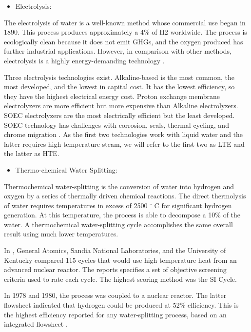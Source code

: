 \documentclass[11pt,letterpaper]{article}
\begin{document}
\begin{itemize}
	\item Electrolysis: 
\end{itemize}

The electrolysis of water is a well-known method whose commercial use began in 1890.
This process produces approximately a 4\% of \gls{H2} worldwide.
The process is ecologically clean because it does not emit \glspl{GHG}, and the oxygen
produced has further industrial applications.
However, in comparison with other methods, electrolysis is a highly energy-demanding technology 
\cite{kalamaras_hydrogen_2013}.

Three electrolysis technologies exist.
Alkaline-based is the most common, the most developed, and the lowest in capital cost.
It has the lowest efficiency, so they have the highest electrical energy cost.
Proton exchange membrane electrolyzers are more efficient but more expensive than Alkaline electrolyzers.
\gls{SOEC} electrolyzers are the most electrically efficient but the least developed.
\gls{SOEC} technology has challenges with corrosion, seals, thermal cycling, and chrome migration \cite{kalamaras_hydrogen_2013}.
As the first two technologies work with liquid water and the latter requires high temperature steam, we will refer to the first two as \gls{LTE} and the latter as \gls{HTE}.

\begin{itemize}
	\item Thermo-chemical Water Splitting:
\end{itemize}

Thermochemical water-splitting is the conversion of water into hydrogen and oxygen by a series of thermally driven chemical reactions.
The direct thermolysis of water requires temperatures in excess of 2500 $^{\circ}$ C for significant hydrogen generation.
At this temperature, the process is able to decompose a 10\% of the water.
A thermochemical water-splitting cycle accomplishes the same overall result using much lower temperatures.

In \cite{brown_high_2003}, General Atomics, Sandia National Laboratories, and the University of Kentucky compared 115 cycles that would use high temperature heat from an advanced nuclear reactor.
The reports specifies a set of objective screening criteria used to rate each cycle.
The highest scoring method was the \gls{SI} Cycle.

In 1978 and 1980, the process was coupled to a nuclear reactor.
The latter flowsheet indicated that hydrogen could be produced at 52\% efficiency.
This is the highest efficiency reported for any water-splitting process, based on an integrated flowsheet \cite{brown_high_2003}.
\end{document}
